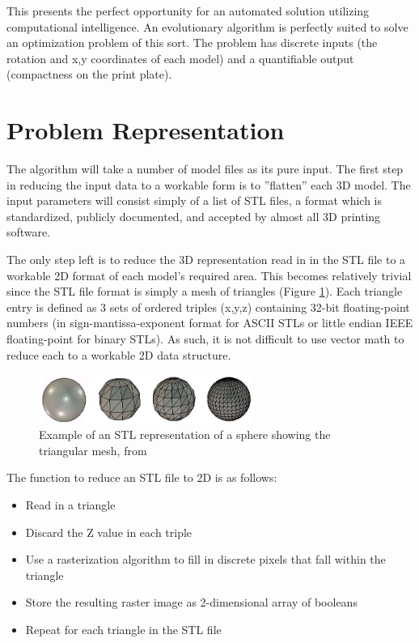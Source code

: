 \documentclass[conference]{IEEEtran}
\begin{document}
This presents the perfect opportunity for an automated solution utilizing computational intelligence. An evolutionary algorithm is perfectly suited to solve an optimization problem of this sort. The problem has discrete inputs (the rotation and x,y coordinates of each model) and a quantifiable output (compactness on the print plate).

\section{Problem Representation}\label{sect:prob_rep}
The algorithm will take a number of model files as its pure input. The first step in reducing the input data to a workable form is to ”flatten” each 3D model. The input parameters will consist simply of a list of STL files, a format which is standardized, publicly documented, and accepted by almost all 3D printing software.

The only step left is to reduce the 3D representation read in in the STL file to a workable 2D format of each model’s required area. This becomes relatively trivial since the STL file format is simply a mesh of triangles (Figure \ref{fig:stl_mesh_spehere}). Each triangle entry is defined as 3 sets of ordered triples (x,y,z) containing 32-bit floating-point numbers (in sign-mantissa-exponent format for ASCII STLs or little endian IEEE floating-point for binary STLs). As such, it is not difficult to use vector math to reduce each to a workable 2D data structure.

\begin{figure}[ht]
\centering
\includegraphics[width=2.75in]{stl_mesh_sphere.png}
\caption{Example of an STL representation of a sphere showing the triangular mesh, from \cite{3d_printing_mesh}}
\label{fig:stl_mesh_spehere}
\end{figure}

The function to reduce an STL file to 2D is as follows:

\begin{itemize}
\item Read in a triangle
\item Discard the Z value in each triple
\item Use a rasterization algorithm to fill in discrete pixels that
fall within the triangle
\item Store the resulting raster image as 2-dimensional array of booleans
\item Repeat for each triangle in the STL file
\end{itemize}
\end{document}
